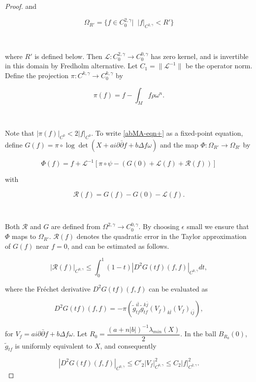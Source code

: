 \documentclass[11pt,letterpaper]{amsart}
\newcommand{\bj}{\bar{j}}
\newcommand{\bl}{\bar{l}}
\newcommand{\pbp}{\partial \bar{\partial}}
\numberwithin{equation}{section}
\begin{document}
\begin{itemize}
\begin{proof}
 \noindent and 

 $$\Omega_{R'} = \{f \in C_0^{2,\gamma} | \;\;|f|_{C^{2,\gamma}} < R'\}$$

 \

 
 \noindent where $R'$ is defined below. Then $\mathcal{L}: C_0^{2, \gamma} \to C_0^{0, \gamma}$ has zero kernel, and is invertible in this domain by Fredholm alternative. Let $C_1= \|\mathcal{L}^{-1}\|$ be the operator norm. Define the projection $\pi: C^{k, \gamma} \to C_0^{k, \gamma} $ by

 $$\pi(f) = f- \int_M f \rho \omega^n .$$

 \

 
 
Note that $|\pi(f)|_{C^0}< 2|f|_{C^0}$. To write \eqref{abMA-eqn+} as a fixed-point equation, define $G(f) = \pi \circ \log \det( X + a i \pbp f + b \Delta f \omega)$ and the map $\Phi: \Omega_{R'} \to \Omega_{R'}$ by


$$\Phi(f) = f + \mathcal L ^{-1}\left[ \pi\circ\psi-( G(0) + \mathcal{L}(f) + \mathcal{R}(f) ) \right]$$

\noindent with

$$\mathcal{R}(f) = G(f) - G(0) - \mathcal L(f).$$

\

Both $\mathcal{R}$ and $G$ are defined from $\Omega^{2, \gamma} \to C_0^{0,\gamma}$. By choosing $\epsilon$ small we ensure that $\Phi$ maps to $\Omega_{R'}$. $\mathcal{R}(f)$ denotes the quadratic error in the Taylor approximation of $G(f)$ near $f=0$, and can be estimated as follows. 

$$|\mathcal R(f)|_{C^{0, \gamma}} \leq \int_0^1 (1-t)|D^2G(tf)(f,f)|_{C^{0, \gamma}} dt,$$

\noindent where the Fr\'echet derivative $D^2G(tf)(f,f)$ can be evaluated as

$$D^2G(tf)(f,f) = - \pi(\tilde g_{tf}^{i \bl} \tilde g_{tf}^{k \bj} (V_f)_{k \bl} (V_f)_{i \bj}),$$

\noindent for $V_f = a i \pbp f + b \Delta f \omega$. Let $R_0 = \dfrac{(a + n |b|)^{-1} \lambda_{min}(X)}{2}$. In the ball $B_{R_0}(0)$, $\tilde g_{tf}$ is uniformly equivalent to $X$, and consequently 



$$|D^2G(tf)(f,f)|_{C^{0, \gamma}} \leq C'_2 |V_f|_{C^{0, \gamma}}^2 \leq C_2 |f|^2_{C^{2, \gamma}}.$$



\end{proof}
\end{itemize}
\end{document}

